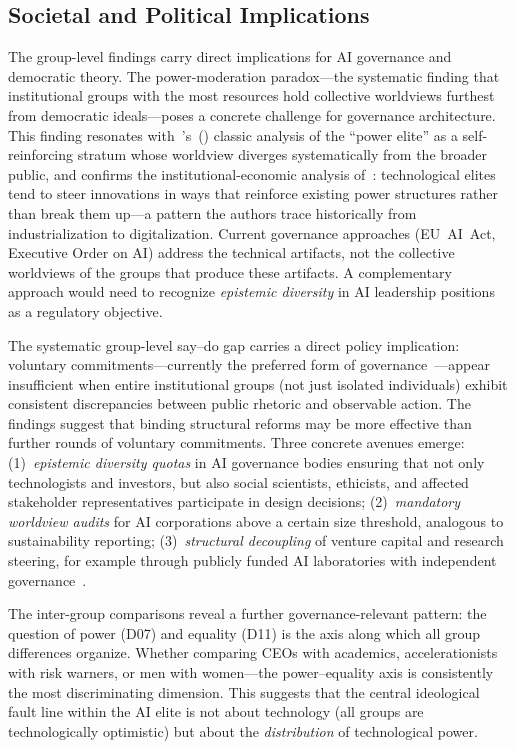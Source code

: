\documentclass[12pt,a4paper]{article}
\begin{document}
\subsection{Societal and Political Implications}
\label{sec:diskussion:implikationen}

The group-level findings carry direct implications for AI governance and democratic theory. The power-moderation paradox---the systematic finding that institutional groups with the most resources hold collective worldviews furthest from democratic ideals---poses a concrete challenge for governance architecture. This finding resonates with~\citeauthor{Mills1956}'s~(\citeyear{Mills1956}) classic analysis of the ``power elite'' as a self-reinforcing stratum whose worldview diverges systematically from the broader public, and confirms the institutional-economic analysis of~\citet{AcemogluJohnson2023}: technological elites tend to steer innovations in ways that reinforce existing power structures rather than break them up---a pattern the authors trace historically from industrialization to digitalization. Current governance approaches (EU~AI~Act, Executive Order on AI) address the technical artifacts, not the collective worldviews of the groups that produce these artifacts. A complementary approach would need to recognize \emph{epistemic diversity} in AI leadership positions as a regulatory objective.

The systematic group-level say--do gap carries a direct policy implication: voluntary commitments---currently the preferred form of governance~\citep[cf.][]{Bengio2024}---appear insufficient when entire institutional groups (not just isolated individuals) exhibit consistent discrepancies between public rhetoric and observable action. The findings suggest that binding structural reforms may be more effective than further rounds of voluntary commitments. Three concrete avenues emerge: (1)~\emph{epistemic diversity quotas} in AI governance bodies ensuring that not only technologists and investors, but also social scientists, ethicists, and affected stakeholder representatives participate in design decisions; (2)~\emph{mandatory worldview audits} for AI corporations above a certain size threshold, analogous to sustainability reporting; (3)~\emph{structural decoupling} of venture capital and research steering, for example through publicly funded AI laboratories with independent governance~\citep[cf.][]{AcemogluJohnson2023}.

The inter-group comparisons reveal a further governance-relevant pattern: the question of power (D07) and equality (D11) is the axis along which all group differences organize. Whether comparing CEOs with academics, accelerationists with risk warners, or men with women---the power--equality axis is consistently the most discriminating dimension. This suggests that the central ideological fault line within the AI elite is not about technology (all groups are technologically optimistic) but about the \emph{distribution} of technological power.
\end{document}

